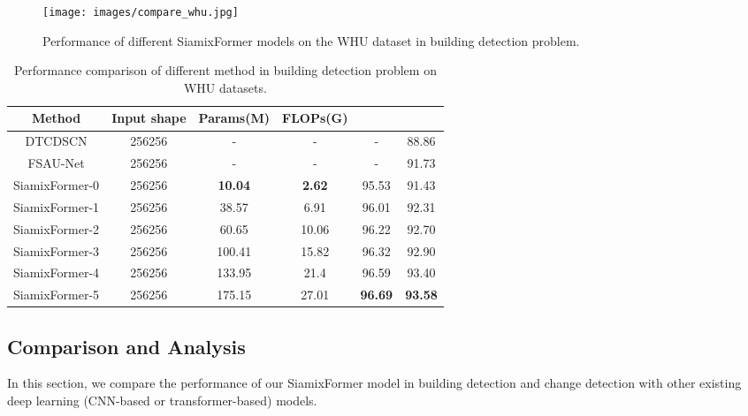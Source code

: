 \documentclass{article}
\begin{document}
\begin{figure*}[t!]
	\begin{center}
		\texttt{[image: images/compare\_whu.jpg]}
		\caption{Performance of different SiamixFormer models on the WHU dataset in building detection problem.}
		\label{compare_whu}
	\end{center}
\end{figure*}

\begin{table}[t!]
	\begin{center}
		\caption{Performance comparison of different method in building detection problem on  WHU datasets.}
		\label{table2}
		\begin{tabular}{c|ccccc}
			
			\hline
			\hline
			Method & Input shape & Params(M) & FLOPs(G) &  &  \\
			\hline
			DTCDSCN & 256256 & -& -&- & 88.86\\
			FSAU-Net & 256256 & -& -&- & 91.73\\
			
			\hline
			SiamixFormer-0 & 256256 & \textbf{10.04} & \textbf{2.62} & 95.53 &91.43 \\
			SiamixFormer-1 & 256256 & 38.57&6.91 & 96.01& 92.31 \\
			SiamixFormer-2 & 256256 & 60.65& 10.06& 96.22& 92.70\\
			SiamixFormer-3 & 256256 & 100.41& 15.82& 96.32& 92.90\\
			SiamixFormer-4 & 256256 & 133.95&21.4 & 96.59&93.40 \\
			SiamixFormer-5 & 256256 & 175.15& 27.01&  \textbf{96.69}&\textbf{93.58} \\
			\hline
			\hline			
			
		\end{tabular}  
	\end{center}
\end{table}

\subsection{Comparison and Analysis}
In this section, we compare the performance of our SiamixFormer model in building detection and change detection with other existing deep learning (CNN-based or transformer-based) models.
\end{document}
